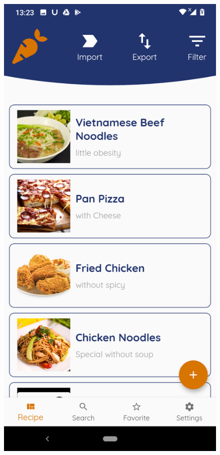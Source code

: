 \documentclass{article}
\begin{document}
\begin{figure}[h!]
    \includegraphics[scale=0.1]{Images/Home_interface.jpg}

\end{figure}
\end{document}
